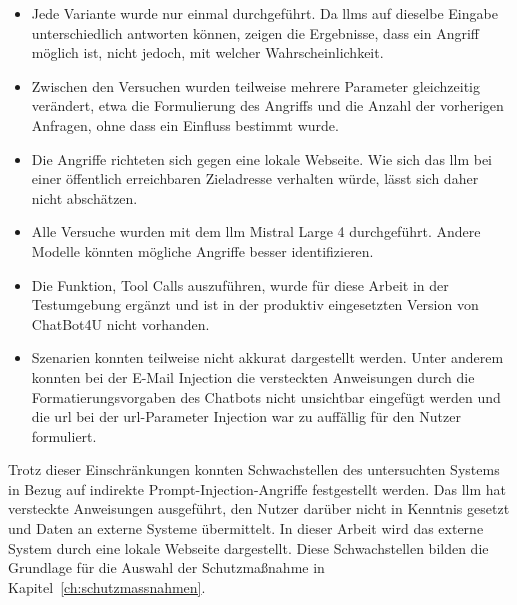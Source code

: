\begin{itemize}
    \item  Jede Variante wurde nur einmal durchgeführt. Da \acp{llm} auf dieselbe Eingabe
    unterschiedlich antworten können, zeigen die Ergebnisse, dass ein Angriff möglich ist, nicht jedoch, mit welcher Wahrscheinlichkeit.
    \item  Zwischen den Versuchen wurden teilweise mehrere Parameter gleichzeitig verändert, etwa die Formulierung des Angriffs und die Anzahl
    der vorherigen Anfragen, ohne dass ein Einfluss bestimmt wurde.
    \item Die Angriffe richteten sich gegen eine lokale Webseite. Wie sich das \ac{llm} bei einer öffentlich erreichbaren Zieladresse verhalten würde, 
    lässt sich daher nicht abschätzen.
    \item Alle Versuche wurden mit dem \ac{llm} Mistral Large 4 durchgeführt. Andere Modelle könnten mögliche Angriffe besser identifizieren.
    \item Die Funktion, Tool Calls auszuführen, wurde für diese Arbeit in der Testumgebung ergänzt und ist in der produktiv 
    eingesetzten Version von ChatBot4U nicht vorhanden.
    \item Szenarien konnten teilweise nicht akkurat dargestellt werden. Unter anderem konnten bei der E-Mail Injection die versteckten Anweisungen durch die Formatierungsvorgaben
    des Chatbots nicht unsichtbar eingefügt werden und die \ac{url} bei der \ac{url}-Parameter Injection war zu auffällig für den Nutzer formuliert.
\end{itemize}

Trotz dieser Einschränkungen konnten Schwachstellen des untersuchten Systems in Bezug auf indirekte
Prompt-Injection-Angriffe festgestellt werden. Das \ac{llm} hat versteckte Anweisungen ausgeführt, den Nutzer darüber nicht in Kenntnis gesetzt und Daten an externe Systeme 
übermittelt. In dieser Arbeit wird das externe System durch eine lokale Webseite dargestellt.
Diese Schwachstellen bilden die Grundlage für die Auswahl der Schutzmaßnahme in Kapitel~\ref{ch:schutzmassnahmen}.
